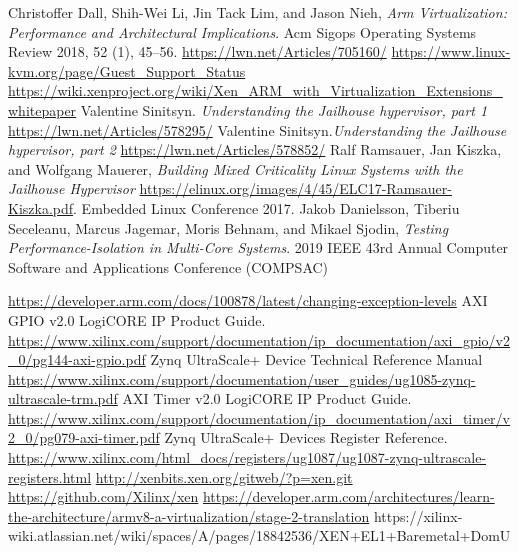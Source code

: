 \documentclass[spanish,12pt,a4paper,oneside]{book}
\begin{document}
\begin{thebibliography}{00}
   Christoffer Dall, Shih-Wei Li, Jin Tack Lim, and Jason Nieh, \emph{Arm Virtualization: Performance and Architectural Implications}. Acm Sigops Operating Systems Review 2018, 52 (1), 45–56.
	 \url{https://lwn.net/Articles/705160/}
   \url{https://www.linux-kvm.org/page/Guest_Support_Status}
   \url{https://wiki.xenproject.org/wiki/Xen_ARM_with_Virtualization_Extensions_whitepaper}
   Valentine Sinitsyn. \emph{Understanding the Jailhouse hypervisor, part 1} \url{https://lwn.net/Articles/578295/}
   Valentine Sinitsyn.\emph{Understanding the Jailhouse hypervisor, part 2} \url{https://lwn.net/Articles/578852/}
   Ralf Ramsauer, Jan Kiszka, and Wolfgang Mauerer, \emph{Building Mixed Criticality Linux Systems with the Jailhouse Hypervisor} \url{https://elinux.org/images/4/45/ELC17-Ramsauer-Kiszka.pdf}. Embedded Linux Conference 2017.
   Jakob Danielsson, Tiberiu Seceleanu, Marcus Jagemar, Moris Behnam, and Mikael Sjodin, \emph{Testing Performance-Isolation in Multi-Core Systems}. 2019 IEEE 43rd Annual Computer Software and Applications Conference (COMPSAC)

	 \url{https://developer.arm.com/docs/100878/latest/changing-exception-levels}
   AXI GPIO v2.0 LogiCORE IP Product Guide. \url{https://www.xilinx.com/support/documentation/ip_documentation/axi_gpio/v2_0/pg144-axi-gpio.pdf}
   Zynq UltraScale+ Device Technical Reference Manual \url{https://www.xilinx.com/support/documentation/user_guides/ug1085-zynq-ultrascale-trm.pdf}
   AXI Timer v2.0 LogiCORE IP Product Guide. \url{https://www.xilinx.com/support/documentation/ip_documentation/axi_timer/v2_0/pg079-axi-timer.pdf}
   Zynq UltraScale+ Devices Register Reference. \url{https://www.xilinx.com/html_docs/registers/ug1087/ug1087-zynq-ultrascale-registers.html}
   \url{http://xenbits.xen.org/gitweb/?p=xen.git}
   \url{https://github.com/Xilinx/xen}
   \url{https://developer.arm.com/architectures/learn-the-architecture/armv8-a-virtualization/stage-2-translation}
   {https://xilinx-wiki.atlassian.net/wiki/spaces/A/pages/18842536/XEN+EL1+Baremetal+DomU}
\end{thebibliography}
\end{document}
